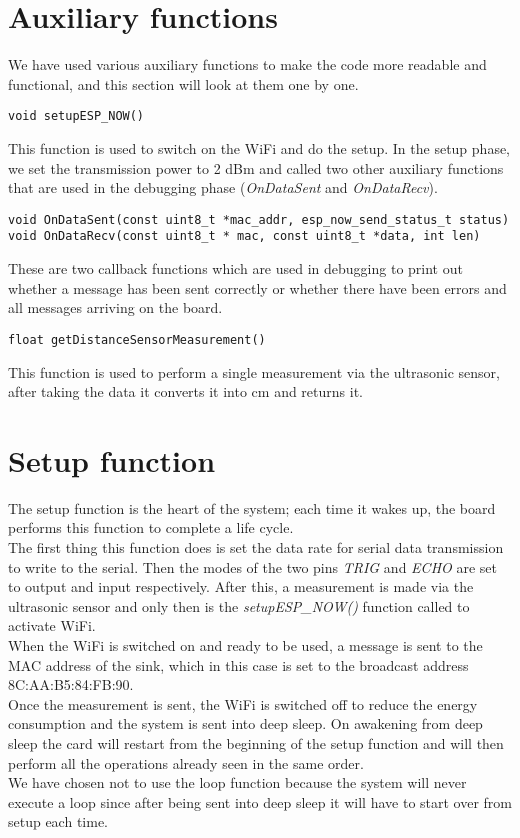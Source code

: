 \section{Auxiliary functions}
We have used various auxiliary functions to make the code more readable and functional, and this section will look at them one by one. \\
\begin{verbatim}
void setupESP_NOW()
\end{verbatim}
This function is used to switch on the WiFi and do the setup.
In the setup phase, we set the transmission power to 2 dBm and called two other auxiliary functions that are used in the debugging phase (\textit{OnDataSent} and \textit{OnDataRecv}). \\
\begin{verbatim}
void OnDataSent(const uint8_t *mac_addr, esp_now_send_status_t status)
void OnDataRecv(const uint8_t * mac, const uint8_t *data, int len) 
\end{verbatim}
These are two callback functions which are used in debugging to print out whether a message has been sent correctly or whether there have been errors and all messages arriving on the board. \\
\begin{verbatim}
float getDistanceSensorMeasurement()
\end{verbatim}
This function is used to perform a single measurement via the ultrasonic sensor, after taking the data it converts it into cm and returns it.

\section{Setup function}
The setup function is the heart of the system; each time it wakes up, the board performs this function to complete a life cycle.\\
The first thing this function does is set the data rate for serial data transmission to write to the serial.
Then the modes of the two pins \textit{TRIG} and \textit{ECHO} are set to output and input respectively.
After this, a measurement is made via the ultrasonic sensor and only then is the \textit{setupESP\_NOW()} function called to activate WiFi.\\
When the WiFi is switched on and ready to be used, a message is sent to the MAC address of the sink, which in this case is set to the broadcast address 8C:AA:B5:84:FB:90.\\
Once the measurement is sent, the WiFi is switched off to reduce the energy consumption and the system is sent into deep sleep.
On awakening from deep sleep the card will restart from the beginning of the setup function and will then perform all the operations already seen in the same order.\\
We have chosen not to use the loop function because the system will never execute a loop since after being sent into deep sleep it will have to start over from setup each time.







